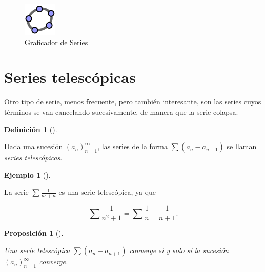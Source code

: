 \documentclass[
  a4paper,
]{scrreport}
\theoremstyle{definition}
\newtheorem{example}{Ejemplo}[chapter]
\theoremstyle{plain}
\theoremstyle{definition}
\newtheorem{definition}{Definición}[chapter]
\theoremstyle{definition}
\theoremstyle{plain}
\theoremstyle{plain}
\newtheorem{proposition}{Proposición}[chapter]
\theoremstyle{remark}
\begin{document}
\begin{figure}[H]

{\centering \includegraphics{img/logos/logo-geogebra.png}

}

\caption{Graficador de Series}

\end{figure}%

\section{Series telescópicas}\label{series-telescuxf3picas}

Otro tipo de serie, menos frecuente, pero también interesante, son las
series cuyos términos se van cancelando sucesivamente, de manera que la
serie colapsa.

\begin{definition}[]\protect\hypertarget{def-series-telescopicas}{}\label{def-series-telescopicas}

Dada una sucesión \((a_n)_{n=1}^\infty\), las series de la forma
\(\sum (a_n-a_{n+1})\) se llaman \emph{series telescópicas}.

\end{definition}

\begin{example}[]\protect\hypertarget{exm-series-teslecopicas}{}\label{exm-series-teslecopicas}

La serie \(\sum \frac{1}{n^2+n}\) es una serie telescópica, ya que

\[
\sum \frac{1}{n^2+1} = \sum \frac{1}{n}-\frac{1}{n+1}.
\]

\end{example}

\begin{proposition}[]\protect\hypertarget{prp-convergencia-series-telescopicas}{}\label{prp-convergencia-series-telescopicas}

Una serie telescópica \(\sum (a_n-a_{n+1})\) converge si y solo si la
sucesión \((a_n)_{n=1}^\infty\) converge.

\end{proposition}
\end{document}
